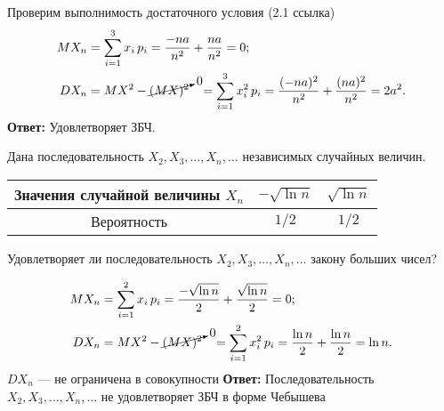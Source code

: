 \begin{slv}
	Проверим выполнимость достаточного условия (2.1 ссылка)
	\begin{align*}
		MX_n &= \sum_{i = 1}^{3} x_i\,p_i = \frac{-na}{n^2} + \frac{na}{n^2} = 0;  \\
		DX_n &= MX^2 - \cancelto{0}{(MX)^2}\;\;\; = \sum_{i = 1}^{3} x_i^2\, p_i = \frac{(-na)^2}{n^2} + \frac{(na)^2}{n^2} = 2a^2.
	\end{align*}
	\textbf{Ответ:} Удовлетворяет ЗБЧ.
\end{slv}

\begin{exm}
	Дана последовательность $X_2, X_3, \dots, X_n, \dots$ независимых случайных величин. 
	\begin{center}\begin{tabular}{|| c || c | c |}
		\hline
		Значения случайной величины $X_n$ & $-\sqrt{\ln n}$ & $\sqrt{\ln n}$ \\
		\hline
		Вероятность & $1/2$ & $1/2$ \\
		\hline
	\end{tabular}\end{center}
	Удовлетворяет ли последовательность $X_2, X_3, \dots, X_n, \dots$ закону больших чисел?
\end{exm}

\begin{slv}
	\begin{align*}
		MX_n &= \sum_{i = 1}^{2} x_i\, p_i = \frac{-\sqrt{\ln n}}{2} + \frac{\sqrt{\ln n}}{2} = 0; \\
		DX_n &= MX^2 - \cancelto{0}{(MX)^2}\;\;\; = \sum_{i = 1}^{2} x_i^2\, p_i = \frac{\ln n}{2} + \frac{\ln n}{2} = \ln n.
	\end{align*}
	$DX_n$ --- не ограничена в совокупности
	\textbf{Ответ:} Последовательность $X_2, X_3, \dots, X_n, \dots $ не удовлетворяет ЗБЧ в форме Чебышева
\end{slv}